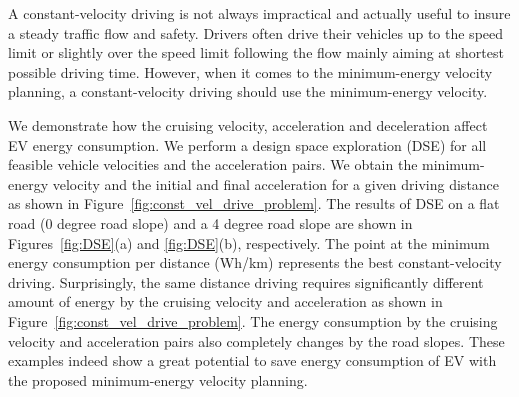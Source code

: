 \documentclass{IEEEtran}
\begin{document}
A constant-velocity driving is not always impractical and actually  useful to insure a steady  traffic flow and safety. Drivers often drive their vehicles up to the speed limit or slightly over the speed limit following the flow mainly aiming at shortest possible driving time. However, when it comes to the minimum-energy velocity planning, a constant-velocity driving should use the minimum-energy velocity. 

We demonstrate how the cruising velocity, acceleration and deceleration affect EV energy consumption. We perform a design space exploration (DSE) for all feasible vehicle velocities and the acceleration pairs. We obtain the minimum-energy velocity and the initial and final acceleration for a given driving distance  as shown in Figure~\ref{fig:const_vel_drive_problem}. The results of DSE on a flat road (0 degree road slope) and a 4 degree road slope are shown in Figures~\ref{fig:DSE}(a) and \ref{fig:DSE}(b), respectively. The point at the minimum energy consumption per distance (Wh/km) represents the best constant-velocity driving. Surprisingly, the same distance driving requires significantly different amount of energy by the cruising velocity and acceleration as shown in Figure~\ref{fig:const_vel_drive_problem}. The energy consumption by the cruising velocity and acceleration pairs also completely changes by the road slopes. These examples indeed show a great potential to save energy consumption of EV with the proposed minimum-energy velocity planning.
\end{document}
